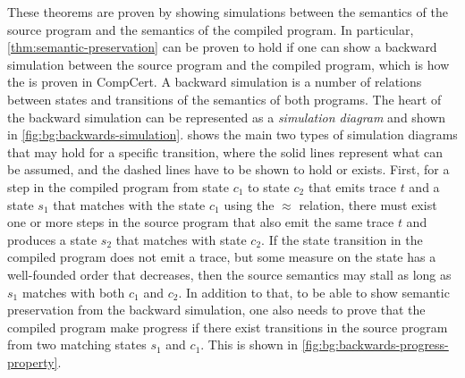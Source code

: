 These theorems are proven by showing simulations between the semantics of the
source program and the semantics of the compiled program.  In particular,
\cref{thm:semantic-preservation} can be proven to hold if one can show a
backward simulation between the source program and the compiled program, which
is how the  is proven in CompCert.  A
backward simulation is a number of relations between states and transitions of
the semantics of both programs.  The heart of the backward simulation can be
represented as a \emph{simulation diagram} and shown in
\cref{fig:bg:backwards-simulation}.  
shows the main two types of simulation diagrams that may hold for a specific
transition, where the solid lines represent what can be assumed, and the dashed
lines have to be shown to hold or exists.  First, for a step in the compiled
program from state $c_1$ to state $c_2$ that emits trace $t$ and a state $s_1$
that matches with the state $c_1$ using the $\approx$ relation, there must exist
one or more steps in the source program that also emit the same trace $t$ and
produces a state $s_2$ that matches with state $c_2$.  If the state transition
in the compiled program does not emit a trace, but some measure on the state has
a well-founded order that decreases, then the source semantics may stall as long
as $s_1$ matches with both $c_1$ and $c_2$.  In addition to that, to be able to
show semantic preservation from the backward simulation, one also needs to
prove that the compiled program make progress if there exist transitions in the
source program from two matching states $s_1$ and $c_1$.  This is shown in
\cref{fig:bg:backwards-progress-property}.


